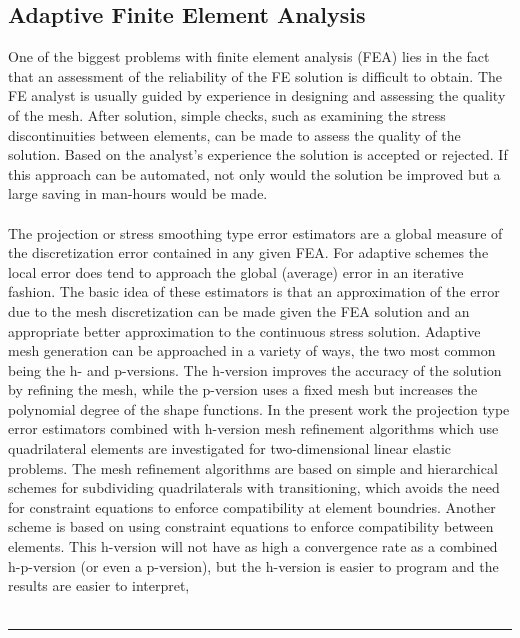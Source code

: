 \documentclass[12pt]{article}
\begin{document}
\subsection{Adaptive Finite Element Analysis}
One of the biggest problems with finite element analysis (FEA) lies in the fact that an
assessment of the reliability of the FE solution is difficult to obtain. The FE
analyst is usually guided by experience in designing and assessing the quality of the mesh. After
solution, simple checks, such as examining the stress discontinuities between elements, can be made
to assess the quality of the solution. Based on the analyst's experience the solution is accepted or
rejected. If this approach can be automated, not only would the solution be improved but a large
saving in man-hours would be made.
\\\\
The projection or stress smoothing type error estimators are a global measure of the
discretization error contained in any given FEA. For adaptive schemes the local error does tend
to approach the global (average) error in an iterative fashion. The basic idea of these estimators
is that an approximation of the error due to the mesh discretization can be made given the FEA
solution and an appropriate better approximation to the continuous stress solution. Adaptive mesh
generation can be approached in a variety of ways, the two most common being the h- and
p-versions. The h-version improves the accuracy of the solution by refining the mesh, while the
p-version uses a fixed mesh but increases the polynomial degree of the shape functions. In the
present work the projection type error estimators combined with h-version mesh refinement
algorithms which use quadrilateral elements are investigated for two-dimensional linear elastic
problems. The mesh refinement algorithms are based on simple and hierarchical schemes
for subdividing quadrilaterals with transitioning, which avoids the need for constraint equations
to enforce compatibility at element boundries. Another scheme is based on using constraint
equations to enforce compatibility between elements. This h-version will not have as high a
convergence rate as a combined h-p-version (or even a p-version), but the h-version is easier to
program and the results are easier to interpret,
\\\\\rule{\textwidth}{.1em}
\end{document}
